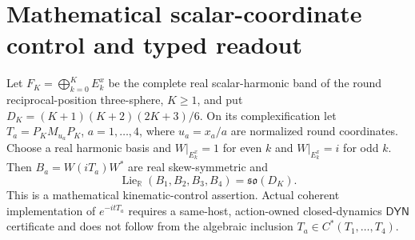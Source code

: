 \documentclass[12pt,a4paper]{article}
\begin{document}
\section{Mathematical scalar-coordinate control and typed readout}
\label{p4a:sec:v3067-coordinate-control}

\begin{theorem}
\label{p4a:thm:finite-coordinate-lie-so}
Let $F_K=\bigoplus_{k=0}^{K}E_k^x$ be the complete real scalar-harmonic
band of the round reciprocal-position three-sphere, $K\ge1$, and put
$D_K=(K+1)(K+2)(2K+3)/6$. On its complexification let
$T_a=P_KM_{u_a}P_K$, $a=1,\dots,4$, where $u_a=x_a/a$
are normalized round coordinates. Choose a real harmonic basis and
$W|_{E_k^x}=1$ for even $k$ and $W|_{E_k^x}=i$ for odd $k$.
Then $B_a=W(iT_a)W^*$ are real skew-symmetric and
\[
 \boxed{\operatorname{Lie}_{\mathbb R}(B_1,B_2,B_3,B_4)
          =\mathfrak{so}(D_K).}
\]
This is a mathematical kinematic-control assertion. Actual coherent
implementation of $e^{-itT_a}$ requires a same-host, action-owned
closed-dynamics $\mathsf{DYN}$ certificate and does not follow from the
algebraic inclusion $T_a\in C^*(T_1,\ldots,T_4)$.
\end{theorem}
\end{document}
